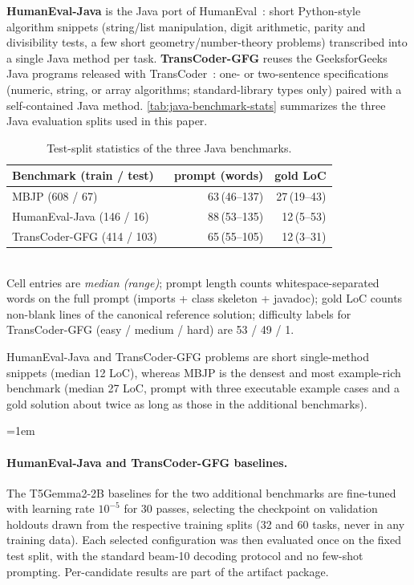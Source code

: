 \textbf{HumanEval-Java} is the Java port of HumanEval~\cite{DBLP:journals/corr/abs-2107-03374}: short Python-style algorithm snippets (string/list manipulation, digit arithmetic, parity and divisibility tests, a few short geometry/number-theory problems) transcribed into a single Java method per task. \textbf{TransCoder-GFG} reuses the GeeksforGeeks Java programs released with TransCoder~\cite{DBLP:conf/nips/LachauxROC20}: one- or two-sentence specifications (numeric, string, or array algorithms; standard-library types only) paired with a self-contained Java method. \autoref{tab:java-benchmark-stats} summarizes the three Java evaluation splits used in this paper.

\begin{table}[ht]
\centering
\small
\caption{Test-split statistics of the three Java benchmarks.}
\label{tab:java-benchmark-stats}
\begin{tabular}{l r r}
\toprule
Benchmark (train / test) & prompt (words) & gold LoC \\
\midrule
MBJP (608 / 67)~\cite{DBLP:conf/iclr/AthiwaratkunGWL23}             & 63\,(46--137) & 27\,(19--43) \\
HumanEval-Java (146 / 16)~\cite{DBLP:journals/corr/abs-2107-03374}  & 88\,(53--135) & 12\,(5--53)  \\
TransCoder-GFG (414 / 103)~\cite{DBLP:conf/nips/LachauxROC20}       & 65\,(55--105) & 12\,(3--31)  \\
\bottomrule
\end{tabular}
\\[2pt]
\footnotesize Cell entries are \emph{median (range)}; prompt length counts whitespace-separated words on the full prompt (imports + class skeleton + javadoc); gold LoC counts non-blank lines of the canonical reference solution; difficulty labels for TransCoder-GFG (easy / medium / hard) are 53 / 49 / 1.
\end{table}

HumanEval-Java and TransCoder-GFG problems are short single-method snippets (median 12 LoC), whereas MBJP is the densest and most example-rich benchmark (median 27 LoC, prompt with three executable example cases and a gold solution about twice as long as those in the additional benchmarks).

\emergencystretch=1em
\paragraph{HumanEval-Java and TransCoder-GFG baselines.}
The T5Gemma2-2B baselines for the two additional benchmarks are fine-tuned with learning rate $10^{-5}$ for 30 passes, selecting the checkpoint on validation holdouts drawn from the respective training splits (32 and 60 tasks, never in any training data). Each selected configuration was then evaluated once on the fixed test split, with the standard beam-10 decoding protocol and no few-shot prompting. Per-candidate results are part of the artifact package.

